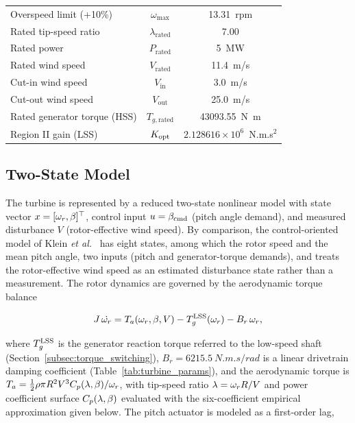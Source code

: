 \begin{table}[H]
\begin{tabular}{lcc}
Overspeed limit (+10\%)    & $\omega_{\max}$     & \SI{13.31}{rpm} \\
Rated tip-speed ratio       & $\lambda_{\text{rated}}$ & 7.00 \\
Rated power                & $P_{\text{rated}}$  & \SI{5}{MW} \\
Rated wind speed           & $V_{\text{rated}}$  & \SI{11.4}{m/s} \\
Cut-in wind speed          & $V_{\text{in}}$     & \SI{3.0}{m/s} \\
Cut-out wind speed         & $V_{\text{out}}$    & \SI{25.0}{m/s} \\
Rated generator torque (HSS) & $T_{g,\text{rated}}$ & \SI{43093.55}{N.m} \\
Region II gain (LSS)        & $K_{\text{opt}}$             & $2.128616\times10^{6}$~N.m.s$^2$ \\
\bottomrule
\end{tabular}
\end{table}

\subsection{Two-State Model}
\label{subsec:two_state_model}

{\color{auditP2}The turbine is
represented by a reduced two-state nonlinear model with state vector
$x = [\omega_r, \beta]^\top$, control input $u = \beta_{\text{cmd}}$ (pitch angle
demand), and measured disturbance $V$ (rotor-effective wind speed). By
comparison, the control-oriented model of Klein \emph{et al.}~\cite{klein2024}
has eight states, among which the rotor speed and the mean pitch angle, two
inputs (pitch and generator-torque demands), and treats the rotor-effective
wind speed as an estimated disturbance state rather than a measurement.} The
rotor dynamics are governed by the aerodynamic torque balance

\begin{equation}
J\,\dot{\omega_r} = T_a(\omega_r, \beta, V) - T_g^{\text{LSS}}(\omega_r) - B_r\,\omega_r,
\label{eq:rotor_ode}
\end{equation}

where $T_g^{\text{LSS}}$ is the generator reaction torque referred to the
low-speed shaft (Section~\ref{subsec:torque_switching}), $B_r =
\SI{6215.5}{N.m.s/rad}$ is a linear drivetrain damping coefficient
(Table~\ref{tab:turbine_params}), and the
aerodynamic torque is
$T_a = \tfrac{1}{2}\rho \pi R^2 V^3 C_p(\lambda,\beta) / \omega_r$, with tip-speed
ratio $\lambda = \omega_r R / V$ and {\color{auditP2}power coefficient surface
$C_p(\lambda,\beta)$ evaluated with the six-coefficient empirical approximation
given below.} The pitch
actuator is modeled as a first-order lag,

